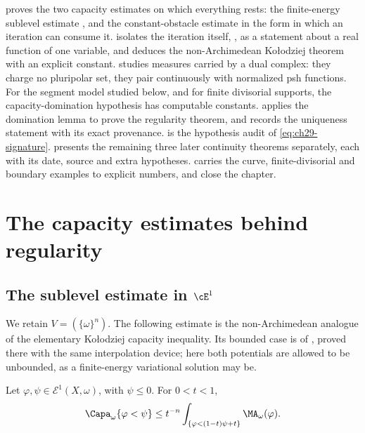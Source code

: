  proves the two capacity estimates on which
everything rests: the finite-energy sublevel estimate
, and the constant-obstacle estimate
 in the form in which an iteration can
consume it.   isolates the iteration itself,
, as a statement about a real function of one
variable, and deduces the non-Archimedean Ko\l odziej theorem
 with an explicit constant.
 studies measures carried by a dual complex: they
charge no pluripolar set, they pair continuously with normalized psh
functions.  For the segment model studied below, and for finite
divisorial supports, the capacity-domination hypothesis has computable
constants.   applies
the domination lemma to prove the regularity theorem, and records the uniqueness
statement with its exact provenance.   is the
hypothesis audit of \eqref{eq:ch29-signature}.  
presents the remaining three later continuity theorems separately, each
with its date, source and extra hypotheses.   carries
the curve, finite-divisorial and boundary examples to explicit numbers, and  close the
chapter.

\section{The capacity estimates behind regularity}
\label{sec:ch29-capacity}

\subsection{The sublevel estimate in \texorpdfstring{$\cE^1$}{E1}}
\label{sec:ch29-sublevel}

We retain $V=(\{\omega\}^n)$.  The following estimate is the
non-Archimedean analogue of the elementary Ko\l odziej capacity inequality.
Its bounded case is  of
, proved there with the same interpolation device;
here both potentials are allowed to be unbounded, as a finite-energy
variational solution may be.

\begin{lemma}\label{lem:bfj-kolodziej-sublevel}
Let $\varphi,\psi\in\mathcal E^1(X,\omega)$, with $\psi\leq0$.  For
$0<t<1$,
\begin{equation}
\label{eq:bfj-kolodziej-sublevel}
 \Capa_\omega\{\varphi<\psi\}
 \leq t^{-n}
 \int_{\{\varphi<(1-t)\psi+t\}}
             \MA_\omega(\varphi).
\end{equation}
\end{lemma}

